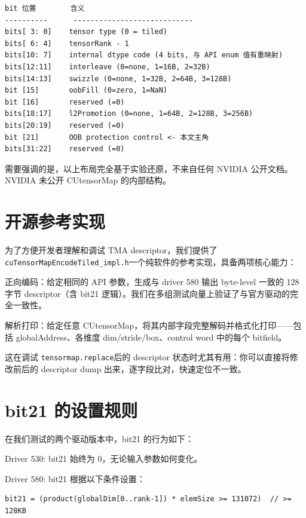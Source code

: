 \begin{lstlisting}
bit 位置        含义
----------      ----------------------------
bits[ 3: 0]    tensor type (0 = tiled)
bits[ 6: 4]    tensorRank - 1
bits[10: 7]    internal dtype code (4 bits, 与 API enum 值有重映射)
bits[12:11]    interleave (0=none, 1=16B, 2=32B)
bits[14:13]    swizzle (0=none, 1=32B, 2=64B, 3=128B)
bit [15]       oobFill (0=zero, 1=NaN)
bit [16]       reserved (=0)
bits[18:17]    l2Promotion (0=none, 1=64B, 2=128B, 3=256B)
bits[20:19]    reserved (=0)
bit [21]       OOB protection control <- 本文主角
bits[31:22]    reserved (=0)
\end{lstlisting}

需要强调的是，以上布局完全基于实验还原，不来自任何 NVIDIA 公开文档。NVIDIA 未公开 CUtensorMap 的内部结构。

\section{开源参考实现}

为了方便开发者理解和调试 TMA descriptor，我们提供了 \lstinline|cuTensorMapEncodeTiled_impl.h|一个纯软件的参考实现，具备两项核心能力：

正向编码：给定相同的 API 参数，生成与 driver 580 输出 byte-level 一致的 128 字节 descriptor（含 bit21 逻辑）。我们在多组测试向量上验证了与官方驱动的完全一致性。

解析打印：给定任意 CUtensorMap，将其内部字段完整解码并格式化打印——包括 globalAddress、各维度 dim/stride/box、control word 中的每个 bitfield。

这在调试 \lstinline|tensormap.replace|后的 descriptor 状态时尤其有用：你可以直接将修改前后的 descriptor dump 出来，逐字段比对，快速定位不一致。

\section{bit21 的设置规则}

在我们测试的两个驱动版本中，bit21 的行为如下：

Driver 530: bit21 始终为 0，无论输入参数如何变化。

Driver 580: bit21 根据以下条件设置：

\begin{lstlisting}
bit21 = (product(globalDim[0..rank-1]) * elemSize >= 131072)  // >= 128KB
\end{lstlisting}

